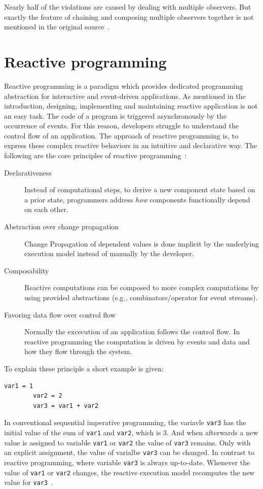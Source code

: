 \documentclass[acmsmall]{acmart}\settopmatter{printfolios=true,printccs=false,printacmref=false}
\begin{document}
		Nearly half of the violations are caused by dealing with multiple observers.
		But exactly the feature of chaining and composing multiple observers together is not mentioned in the original source~\cite{Gamma:1995}.

\section{Reactive programming}
	Reactive programming is a paradigm which provides dedicated programming abstraction for interactive and event-driven applications.
	As mentioned in the introduction, designing, implementing and maintaining reactive application is not an easy task. 
	The code of a program is triggered asynchronously by the occurrence of events.
	For this reason, developers struggle to understand the control flow of an application.
	The approach of reactive programming is, to express these complex reactive behaviors in an intuitive and declarative way.
	The following are the core principles of reactive programming~\cite{Salvaneschi:2015,Salvaneschi:2017}:

	\begin{description}
		\item[Declarativeness] Instead of computational steps, to derive a new component state based on a prior state,
		programmers address \textit{how} components functionally depend on each other.
		\item[Abstraction over change propagation] Change Propagation of dependent values is done implicit by the underlying execution model instead of manually by the developer.
		\item[Composability] Reactive computations can be composed to more complex computations by using provided abstractions (e.g., combinators/operator for event streams).
		\item[Favoring data flow over control flow] Normally the excecution of an application follows the control flow. 
		In reactive programming the computation is driven by events and data and how they flow through the system.
	\end{description}

	To explain these principle a short example is given:

	\begin{lstlisting}[label=lst:referenz]
		var1 = 1
		var2 = 2
		var3 = var1 + var2
	\end{lstlisting}

	In conventional sequential imperative programming, 
	the variavle \lstinline|var3| has the initial value of the sum of \lstinline|var1| and \lstinline|var2|, which is 3.
	And when afterwards a new value is assigned to variable \lstinline|var1| or \lstinline|var2| the value of \lstinline|var3| remains.
	Only with an explicit assignment, the value of varialbe \lstinline|var3| can be changed. In contrast to reactive programming, 
	where variable \lstinline|var3| is always up-to-date. Whenever the value of \lstinline|var1| or \lstinline|var2| changes, 
	the reactive execution model recomputes the new value for \lstinline|var3|~\cite{Bainomugisha:2013}.
	
\end{document}
